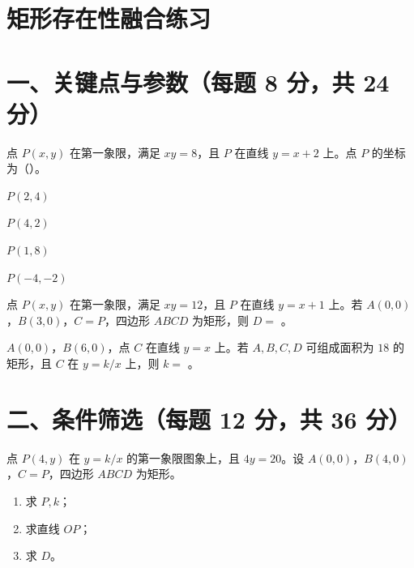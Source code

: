 \documentclass{exam-zh}
\newcommand{\answerarea}[1][40mm]{%
  \vspace{2mm}%
  \begin{tcolorbox}[
    enhanced, breakable,
    colback=white,
    colframe=white,
    boxrule=0pt,
    height=#1,
    valign=top,
    bottom=0mm,
    after skip=0mm,
  ]
  \end{tcolorbox}%
}
\begin{document}
\section*{矩形存在性融合练习}

\section*{一、关键点与参数（每题 8 分，共 24 分）}


\begin{question}[points=8]
  点 $P(x,y)$ 在第一象限，满足 $xy=8$，且 $P$ 在直线 $y=x+2$ 上。点 $P$ 的坐标为（\quad）。

  \begin{choices}
    \item $P(2,4)$
    \item $P(4,2)$
    \item $P(1,8)$
    \item $P(-4,-2)$
  \end{choices}
\end{question}



\begin{question}[points=8]
  点 $P(x,y)$ 在第一象限，满足 $xy=12$，且 $P$ 在直线 $y=x+1$ 上。若 $A(0,0)$，$B(3,0)$，$C=P$，四边形 $ABCD$ 为矩形，则 $D=$ \underline{\hspace{2cm}}。

\end{question}



\begin{question}[points=8]
  $A(0,0)$，$B(6,0)$，点 $C$ 在直线 $y=x$ 上。若 $A,B,C,D$ 可组成面积为 $18$ 的矩形，且 $C$ 在 $y=k/x$ 上，则 $k=$ \underline{\hspace{2cm}}。

\end{question}


\section*{二、条件筛选（每题 12 分，共 36 分）}


\begin{problem}[points=12]
  点 $P(4,y)$ 在 $y=k/x$ 的第一象限图象上，且 $4y=20$。设 $A(0,0)$，$B(4,0)$，$C=P$，四边形 $ABCD$ 为矩形。
\begin{enumerate}[label=(\arabic*)]
  \item 求 $P,k$；
  \item 求直线 $OP$；
  \item 求 $D$。
\end{enumerate}

  \answerarea[55mm]
\end{problem}
\end{document}
